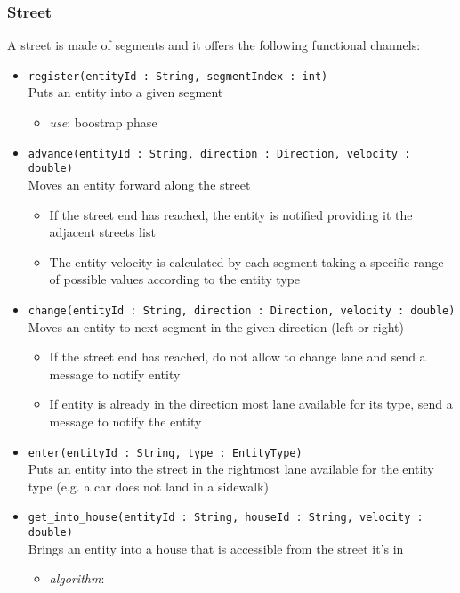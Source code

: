 \subsubsection{Street}
A street is made of segments and it offers the following functional channels:
\begin{itemize}
	\item \texttt{register(entityId : String, segmentIndex : int)}
	\\Puts an entity into a given segment		
	\begin{itemize}
		\item \textit{use}: boostrap phase
	\end{itemize}
	\item \texttt{advance(entityId : String, direction : Direction, velocity : double)}
	\\Moves an entity forward along the street	
	\begin{itemize} 
		\item If the street end has reached, the entity is notified providing it the adjacent streets list
		\item The entity velocity is calculated by each segment taking a specific range of possible values according to the entity type
	\end{itemize}
	\item \texttt{change(entityId : String, direction : Direction, velocity : double)}
	\\Moves an entity to next segment in the given direction (left or right)	
	\begin{itemize}		
		\item If the street end has reached, do not allow to change lane and send a message to notify entity
		\item If entity is already in the direction most lane available for its type, send a message to notify the entity
	\end{itemize}
	\item \texttt{enter(entityId : String, type : EntityType)}
	\\Puts an entity into the street in the rightmost lane available for the entity type (e.g. a car does not land in a sidewalk)
	\item \texttt{get\_into\_house(entityId : String, houseId : String, velocity : double)}
	\\Brings an entity into a house that is accessible from the street it’s in
	\begin{itemize}
		\item \textit{algorithm}:

\end{itemize}
\end{itemize}
